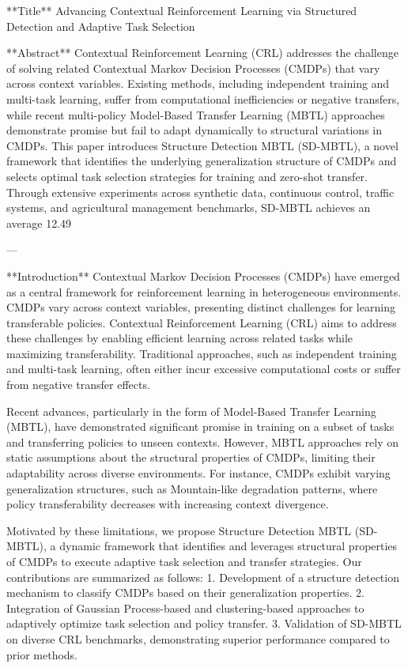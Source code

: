 **Title**  
Advancing Contextual Reinforcement Learning via Structured Detection and Adaptive Task Selection  

**Abstract**  
Contextual Reinforcement Learning (CRL) addresses the challenge of solving related Contextual Markov Decision Processes (CMDPs) that vary across context variables. Existing methods, including independent training and multi-task learning, suffer from computational inefficiencies or negative transfers, while recent multi-policy Model-Based Transfer Learning (MBTL) approaches demonstrate promise but fail to adapt dynamically to structural variations in CMDPs. This paper introduces Structure Detection MBTL (SD-MBTL), a novel framework that identifies the underlying generalization structure of CMDPs and selects optimal task selection strategies for training and zero-shot transfer. Through extensive experiments across synthetic data, continuous control, traffic systems, and agricultural management benchmarks, SD-MBTL achieves an average 12.49%

---

**Introduction**  
Contextual Markov Decision Processes (CMDPs) have emerged as a central framework for reinforcement learning in heterogeneous environments. CMDPs vary across context variables, presenting distinct challenges for learning transferable policies. Contextual Reinforcement Learning (CRL) aims to address these challenges by enabling efficient learning across related tasks while maximizing transferability. Traditional approaches, such as independent training and multi-task learning, often either incur excessive computational costs or suffer from negative transfer effects.  

Recent advances, particularly in the form of Model-Based Transfer Learning (MBTL), have demonstrated significant promise in training on a subset of tasks and transferring policies to unseen contexts. However, MBTL approaches rely on static assumptions about the structural properties of CMDPs, limiting their adaptability across diverse environments. For instance, CMDPs exhibit varying generalization structures, such as Mountain-like degradation patterns, where policy transferability decreases with increasing context divergence.  

Motivated by these limitations, we propose Structure Detection MBTL (SD-MBTL), a dynamic framework that identifies and leverages structural properties of CMDPs to execute adaptive task selection and transfer strategies. Our contributions are summarized as follows:
1. Development of a structure detection mechanism to classify CMDPs based on their generalization properties.  
2. Integration of Gaussian Process-based and clustering-based approaches to adaptively optimize task selection and policy transfer.  
3. Validation of SD-MBTL on diverse CRL benchmarks, demonstrating superior performance compared to prior methods.  

